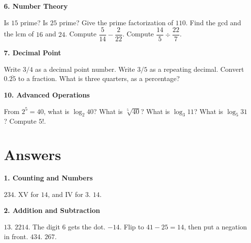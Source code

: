 \vspace{0.9em}
\noindent\textbf{6. Number Theory}
\begin{list}{}{\setlength{\leftmargin}{1.5em}\setlength{\itemsep}{0.35em}\setlength{\parsep}{0pt}\setlength{\topsep}{0.4em}}
 Is $15$ prime? Is $25$ prime?
 Give the prime factorization of $110$.
 Find the gcd and the lcm of $16$ and $24$.
 Compute $\dfrac{5}{14} - \dfrac{2}{22}$.
 Compute $\dfrac{14}{5} \div \dfrac{22}{7}$.
\end{list}

\vspace{0.9em}
\noindent\textbf{7. Decimal Point}
\begin{list}{}{\setlength{\leftmargin}{1.5em}\setlength{\itemsep}{0.35em}\setlength{\parsep}{0pt}\setlength{\topsep}{0.4em}}
 Write $3/4$ as a decimal point number.
 Write $3/5$ as a repeating decimal.
 Convert $0.\overline{25}$ to a fraction.
 What is three quarters, as a percentage?
\end{list}

\vspace{0.9em}
\noindent\textbf{10. Advanced Operations}
\begin{list}{}{\setlength{\leftmargin}{1.5em}\setlength{\itemsep}{0.35em}\setlength{\parsep}{0pt}\setlength{\topsep}{0.4em}}
 From $2^{5} = 40$, what is $\log_{2} 40$? What is $\sqrt[5]{40}$?
 What is $\log_{3} 11$? What is $\log_{5} 31$?
 Compute $5!$.
\end{list}

\clearpage
\section{Answers}

\vspace{0.3em}
\noindent\textbf{1. Counting and Numbers}
\begin{list}{}{\setlength{\leftmargin}{1.5em}\setlength{\itemsep}{0.35em}\setlength{\parsep}{0pt}\setlength{\topsep}{0.4em}}
 $234$.
 XV for $14$, and IV for $3$.
 $14$.
\end{list}

\vspace{0.9em}
\noindent\textbf{2. Addition and Subtraction}
\begin{list}{}{\setlength{\leftmargin}{1.5em}\setlength{\itemsep}{0.35em}\setlength{\parsep}{0pt}\setlength{\topsep}{0.4em}}
 $13$.
 $2214$. The digit $6$ gets the dot.
 $-14$. Flip to $41 - 25 = 14$, then put a negation in front.
 $434$.
 $267$.
\end{list}

